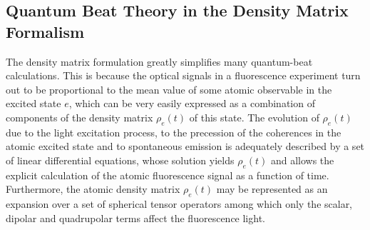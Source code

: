 \documentclass[11pt]{article}
\begin{document}
\begin{appendices}
	


\section{Quantum Beat Theory in the Density Matrix Formalism \cite{haroche}}\label{app:quantum_beats}



The density matrix formulation greatly simplifies many quantum-beat calculations. This is because the optical signals in a fluorescence experiment turn out to be proportional to the mean value of some atomic observable in the excited state $e$, which can be very easily expressed as a combination of components of the density matrix $\rho_e(t)$ of this state. The evolution of $\rho_e(t)$ due to the light excitation process, to the precession of the coherences
in the atomic excited state and to spontaneous emission is adequately described by a set of linear differential equations, whose solution yields $\rho_e(t)$ and allows the explicit calculation of the atomic fluorescence signal as a function of time. Furthermore, the atomic density matrix $\rho_e(t)$ may be represented as an expansion over a set of spherical tensor operators
among which only the scalar, dipolar and quadrupolar terms affect the fluorescence light.  


\end{appendices}
\end{document}
